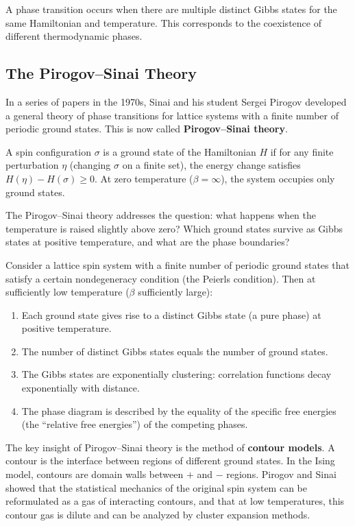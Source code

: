 A phase transition occurs when there are multiple distinct Gibbs states for the same Hamiltonian and temperature. This corresponds to the coexistence of different thermodynamic phases.

\subsection{The Pirogov--Sinai Theory}

In a series of papers in the 1970s, Sinai and his student Sergei Pirogov developed a general theory of phase transitions for lattice systems with a finite number of periodic ground states. This is now called \textbf{Pirogov--Sinai theory}.

\begin{definition}
A spin configuration \(\sigma\) is a ground state of the Hamiltonian \(H\) if for any finite perturbation \(\eta\) (changing \(\sigma\) on a finite set), the energy change satisfies \(H(\eta) - H(\sigma) \ge 0\). At zero temperature (\(\beta = \infty\)), the system occupies only ground states.
\end{definition}

The Pirogov--Sinai theory addresses the question: what happens when the temperature is raised slightly above zero? Which ground states survive as Gibbs states at positive temperature, and what are the phase boundaries?

\begin{theorem}
Consider a lattice spin system with a finite number of periodic ground states that satisfy a certain nondegeneracy condition (the Peierls condition). Then at sufficiently low temperature (\(\beta\) sufficiently large):
\begin{enumerate}
  \item Each ground state gives rise to a distinct Gibbs state (a pure phase) at positive temperature.
  \item The number of distinct Gibbs states equals the number of ground states.
  \item The Gibbs states are exponentially clustering: correlation functions decay exponentially with distance.
  \item The phase diagram is described by the equality of the specific free energies (the ``relative free energies'') of the competing phases.
\end{enumerate}
\end{theorem}

The key insight of Pirogov--Sinai theory is the method of \textbf{contour models}. A contour is the interface between regions of different ground states. In the Ising model, contours are domain walls between \(+\) and \(-\) regions. Pirogov and Sinai showed that the statistical mechanics of the original spin system can be reformulated as a gas of interacting contours, and that at low temperatures, this contour gas is dilute and can be analyzed by cluster expansion methods.

